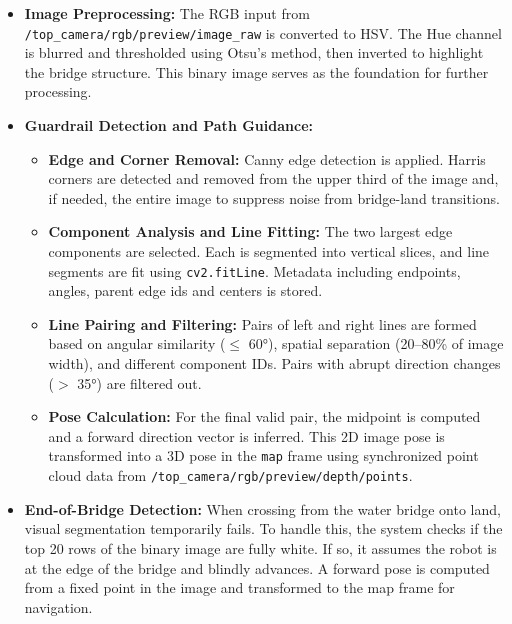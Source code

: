 \documentclass[a4paper]{article}
\begin{document}
\begin{itemize}
    \item \textbf{Image Preprocessing:} The RGB input from \texttt{/top\_camera/rgb/preview/image\_raw} is converted to HSV. The Hue channel is blurred and thresholded using Otsu's method, then inverted to highlight the bridge structure. This binary image serves as the foundation for further processing.

    \item \textbf{Guardrail Detection and Path Guidance:}
    \begin{itemize}
        \item \textbf{Edge and Corner Removal:} Canny edge detection is applied. Harris corners are detected and removed from the upper third of the image and, if needed, the entire image to suppress noise from bridge-land transitions.
        \item \textbf{Component Analysis and Line Fitting:} The two largest edge components are selected. Each is segmented into vertical slices, and line segments are fit using \texttt{cv2.fitLine}. Metadata including endpoints, angles, parent edge ids and centers is stored.
        \item \textbf{Line Pairing and Filtering:} Pairs of left and right lines are formed based on angular similarity ($\leq$ 60°), spatial separation (20–80\% of image width), and different component IDs. Pairs with abrupt direction changes ($>$ 35°) are filtered out.
        \item \textbf{Pose Calculation:} For the final valid pair, the midpoint is computed and a forward direction vector is inferred. This 2D image pose is transformed into a 3D pose in the \texttt{map} frame using synchronized point cloud data from \texttt{/top\_camera/rgb/preview/depth/points}.
    \end{itemize}
    \item \textbf{End-of-Bridge Detection:} When crossing from the water bridge onto land, visual segmentation temporarily fails. To handle this, the system checks if the top 20 rows of the binary image are fully white. If so, it assumes the robot is at the edge of the bridge and blindly advances. A forward pose is computed from a fixed point in the image and transformed to the map frame for navigation.


\end{itemize}
\end{document}
